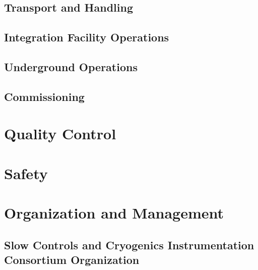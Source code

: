 \subsection{Transport and Handling}
\label{sec:fddp-slow-cryo-install-transport}


\subsection{Integration Facility Operations}
\label{sec:fddp-slow-cryo-install-facil-ops}


\subsection{Underground Operations}
\label{sec:fddp-slow-cryo-install-undergr}

\subsection{Commissioning}
\label{sec:fddp-slow-cryo-install-commiss}



\section{Quality Control}
\label{sec:fddp-slow-cryo-qc}




\section{Safety}
\label{sec:fddp-slow-cryo-safety}



\section{Organization and Management}
\label{sec:fddp-slow-cryo-org}


\subsection{Slow Controls and Cryogenics Instrumentation Consortium Organization}
\label{sec:fddp-slow-cryo-org-consortium}


